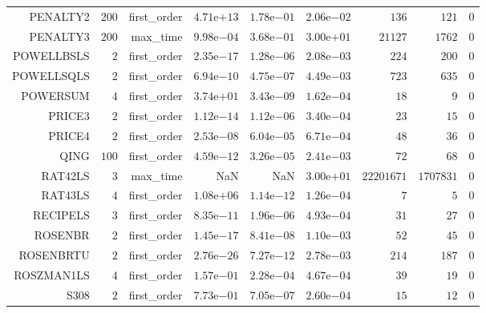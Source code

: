 \begin{longtable}{rrrrrrrrr}
PENALTY2 & \(   200\) & first\_order & \( 4.71\)e\(+13\) & \( 1.78\)e\(-01\) & \( 2.06\)e\(-02\) & \(   136\) & \(   121\) & \(     0\) \\
PENALTY3 & \(   200\) & max\_time & \( 9.98\)e\(-04\) & \( 3.68\)e\(-01\) & \( 3.00\)e\(+01\) & \( 21127\) & \(  1762\) & \(     0\) \\
POWELLBSLS & \(     2\) & first\_order & \( 2.35\)e\(-17\) & \( 1.28\)e\(-06\) & \( 2.08\)e\(-03\) & \(   224\) & \(   200\) & \(     0\) \\
POWELLSQLS & \(     2\) & first\_order & \( 6.94\)e\(-10\) & \( 4.75\)e\(-07\) & \( 4.49\)e\(-03\) & \(   723\) & \(   635\) & \(     0\) \\
POWERSUM & \(     4\) & first\_order & \( 3.74\)e\(+01\) & \( 3.43\)e\(-09\) & \( 1.62\)e\(-04\) & \(    18\) & \(     9\) & \(     0\) \\
PRICE3 & \(     2\) & first\_order & \( 1.12\)e\(-14\) & \( 1.12\)e\(-06\) & \( 3.40\)e\(-04\) & \(    23\) & \(    15\) & \(     0\) \\
PRICE4 & \(     2\) & first\_order & \( 2.53\)e\(-08\) & \( 6.04\)e\(-05\) & \( 6.71\)e\(-04\) & \(    48\) & \(    36\) & \(     0\) \\
QING & \(   100\) & first\_order & \( 4.59\)e\(-12\) & \( 3.26\)e\(-05\) & \( 2.41\)e\(-03\) & \(    72\) & \(    68\) & \(     0\) \\
RAT42LS & \(     3\) & max\_time &       NaN &       NaN & \( 3.00\)e\(+01\) & \(22201671\) & \(1707831\) & \(     0\) \\
RAT43LS & \(     4\) & first\_order & \( 1.08\)e\(+06\) & \( 1.14\)e\(-12\) & \( 1.26\)e\(-04\) & \(     7\) & \(     5\) & \(     0\) \\
RECIPELS & \(     3\) & first\_order & \( 8.35\)e\(-11\) & \( 1.96\)e\(-06\) & \( 4.93\)e\(-04\) & \(    31\) & \(    27\) & \(     0\) \\
ROSENBR & \(     2\) & first\_order & \( 1.45\)e\(-17\) & \( 8.41\)e\(-08\) & \( 1.10\)e\(-03\) & \(    52\) & \(    45\) & \(     0\) \\
ROSENBRTU & \(     2\) & first\_order & \( 2.76\)e\(-26\) & \( 7.27\)e\(-12\) & \( 2.78\)e\(-03\) & \(   214\) & \(   187\) & \(     0\) \\
ROSZMAN1LS & \(     4\) & first\_order & \( 1.57\)e\(-01\) & \( 2.28\)e\(-04\) & \( 4.67\)e\(-04\) & \(    39\) & \(    19\) & \(     0\) \\
S308 & \(     2\) & first\_order & \( 7.73\)e\(-01\) & \( 7.05\)e\(-07\) & \( 2.60\)e\(-04\) & \(    15\) & \(    12\) & \(     0\) \\

\end{longtable}

